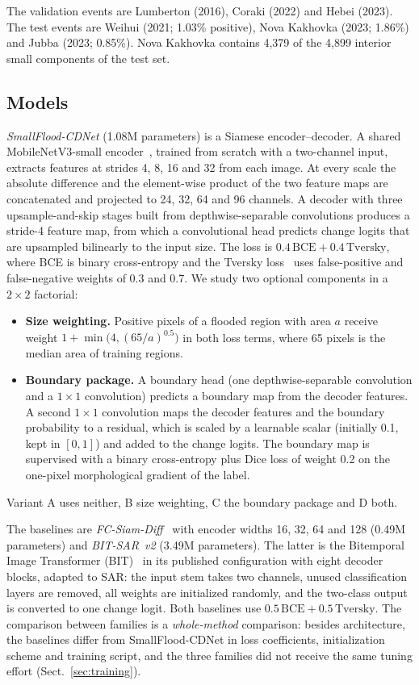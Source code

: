 \documentclass[runningheads]{llncs}
\begin{document}
The validation events are Lumberton (2016), Coraki (2022) and Hebei (2023). The test events
are Weihui (2021; 1.03\% positive), Nova Kakhovka (2023; 1.86\%) and Jubba (2023; 0.85\%).
Nova Kakhovka contains 4,379 of the 4,899 interior small components of the test set.

\subsection{Models}

\emph{SmallFlood-CDNet} (1.08M parameters) is a Siamese encoder--decoder. A shared
MobileNetV3-small encoder~\cite{howard2019mobilenetv3}, trained from scratch with a
two-channel input, extracts features at strides 4, 8, 16 and 32 from each image. At every
scale the absolute difference and the element-wise product of the two feature maps are
concatenated and projected to 24, 32, 64 and 96 channels. A decoder with three
upsample-and-skip stages built from depthwise-separable convolutions produces a stride-4
feature map, from which a convolutional head predicts change logits that are upsampled
bilinearly to the input size. The loss is $0.4\,\mathrm{BCE} + 0.4\,\mathrm{Tversky}$, where
BCE is binary cross-entropy and the Tversky loss~\cite{salehi2017tversky} uses
false-positive and false-negative weights of 0.3 and 0.7. We study two optional components
in a $2\times 2$ factorial:
\begin{itemize}
\item \textbf{Size weighting.} Positive pixels of a flooded region with area $a$ receive
weight $1 + \min\bigl(4, (65/a)^{0.5}\bigr)$ in both loss terms, where 65 pixels is the
median area of training regions.
\item \textbf{Boundary package.} A boundary head (one depthwise-separable convolution and a
$1\times 1$ convolution) predicts a boundary map from the decoder features. A second
$1\times 1$ convolution maps the decoder features and the boundary probability to a residual,
which is scaled by a learnable scalar (initially 0.1, kept in $[0,1]$) and added to the
change logits. The boundary map is supervised with a binary cross-entropy plus Dice loss of
weight 0.2 on the one-pixel morphological gradient of the label.
\end{itemize}
Variant A uses neither, B size weighting, C the boundary package and D both.

The baselines are \emph{FC-Siam-Diff}~\cite{daudt2018fcsiam} with encoder widths 16, 32, 64
and 128 (0.49M parameters) and \emph{BIT-SAR~v2} (3.49M parameters). The latter is the
Bitemporal Image Transformer (BIT)~\cite{chen2022bit} in its published configuration with
eight decoder blocks, adapted to SAR: the input stem takes two channels, unused
classification layers are removed, all weights are initialized randomly, and the two-class
output is converted to one change logit. Both baselines use
$0.5\,\mathrm{BCE} + 0.5\,\mathrm{Tversky}$. The comparison between families is a
\emph{whole-method} comparison: besides architecture, the baselines differ from
SmallFlood-CDNet in loss coefficients, initialization scheme and training script, and the
three families did not receive the same tuning effort (Sect.~\ref{sec:training}).
\end{document}

